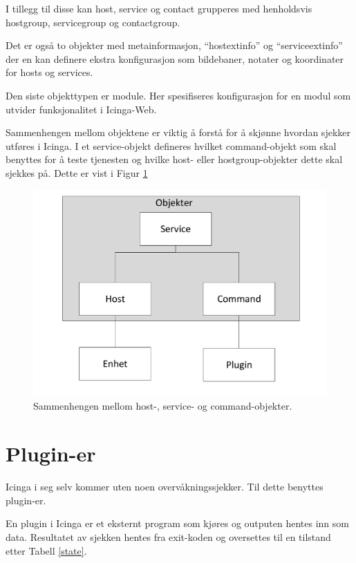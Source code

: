 I tillegg til disse kan host, service og contact grupperes med henholdsvis hostgroup, servicegroup og contactgroup.

Det er også to objekter med metainformasjon, “hostextinfo” og “serviceextinfo” der en kan definere ekstra konfigurasjon som bildebaner, notater og koordinater for hosts og services.

Den siste objekttypen er module. Her spesifiseres konfigurasjon for en modul som utvider funksjonalitet i Icinga-Web.

Sammenhengen mellom objektene er viktig å forstå for å skjønne hvordan sjekker utføres i Icinga. I et service-objekt defineres hvilket command-objekt som skal benyttes for å teste tjenesten og hvilke host- eller hostgroup-objekter dette skal sjekkes på. Dette er vist i Figur \ref{command_host_service}

\begin{figure}
    \centering
    \includegraphics[scale=0.4]{img/command_host_service}
    \caption{Sammenhengen mellom host-, service- og command-objekter.}
    \label{command_host_service}
\end{figure}

\section{Plugin-er}
Icinga i seg selv kommer uten noen overvåkningssjekker. Til dette benyttes plugin-er.

En plugin i Icinga er et eksternt program som kjøres og outputen hentes inn som data. Resultatet av sjekken hentes fra exit-koden\cite{wiki:returncode} og oversettes til en tilstand etter Tabell \ref{state}.

